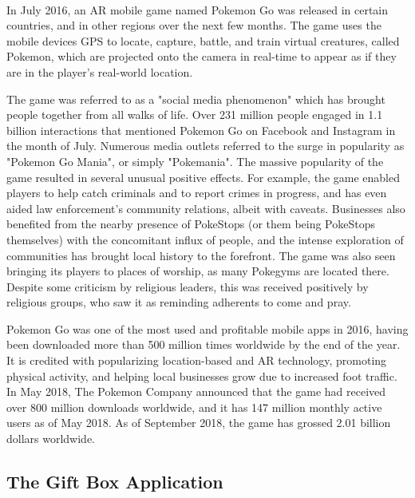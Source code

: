\paragraph{}
In July 2016, an AR mobile game named Pokemon Go was released in certain countries, and in other regions over the next few months. The game uses the mobile devices GPS to locate, capture, battle, and train virtual creatures, called Pokemon, which are projected onto the camera in real-time to appear as if they are in the player's real-world location. 
\par
The game was referred to as a "social media phenomenon" which has brought people together from all walks of life.\cite{duffy_2016} \cite{kain_2016} Over 231 million people engaged in 1.1 billion interactions that mentioned Pokemon Go on Facebook and Instagram in the month of July.\cite{laurenjohnson_2016} Numerous media outlets referred to the surge in popularity as "Pokemon Go Mania", or simply "Pokemania".\cite{isaac_2016} \cite{steinmetz_2016} The massive popularity of the game resulted in several unusual positive effects. For example, the game enabled players to help catch criminals and to report crimes in progress,\cite{daye_2016} \cite{reports_2016} \cite{staff} and has even aided law enforcement's community relations,\cite{cherelus_2016} albeit with caveats.\cite{rocha_2016} Businesses also benefited from the nearby presence of PokeStops (or them being PokeStops themselves) with the concomitant influx of people,\cite{shields_perlberg_2016}\cite{sydneyShaw_2016} and the intense exploration of communities has brought local history to the forefront.\cite{butcher_2016} The game was also seen bringing its players to places of worship, as many Pokegyms are located there.\cite{ahmed_2016} Despite some criticism by religious leaders, this was received positively by religious groups, who saw it as reminding adherents to come and pray.\cite{r_2016}
\par
Pokemon Go was one of the most used and profitable mobile apps in 2016, having been downloaded more than 500 million times worldwide by the end of the year. It is credited with popularizing location-based and AR technology, promoting physical activity, and helping local businesses grow due to increased foot traffic. In May 2018, The Pokemon Company announced that the game had received over 800 million downloads worldwide, and it has 147 million monthly active users as of May 2018. As of September 2018, the game has grossed 2.01 billion dollars worldwide.

\subsection{The Gift Box Application}
